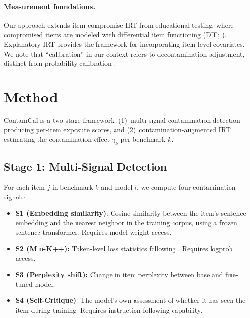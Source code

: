 \documentclass[11pt,a4paper]{article}
\newcommand{\gam}{\gamma}
\begin{document}
\paragraph{Measurement foundations.}
Our approach extends item compromise IRT \citep{eckerly2017detecting,sinharay2017assessment} from educational testing, where compromised items are modeled with differential item functioning (DIF; \citealp{holland1993differential,thissen1993detection,zumbo1999handbook}).
Explanatory IRT \citep{de2004explanatory} provides the framework for incorporating item-level covariates.
We note that ``calibration'' in our context refers to decontamination adjustment, distinct from probability calibration \citep{guo2017calibration,platt1999probabilistic}.

\section{Method}
\label{sec:method}

ContamCal is a two-stage framework: (1)~multi-signal contamination detection producing per-item exposure scores, and (2)~contamination-augmented IRT estimating the contamination effect $\gam_k$ per benchmark $k$.

\subsection{Stage 1: Multi-Signal Detection}
\label{sec:detection}

For each item $j$ in benchmark $k$ and model $i$, we compute four contamination signals:

\begin{itemize}
    \item \textbf{S1 (Embedding similarity)}: Cosine similarity between the item's sentence embedding and the nearest neighbor in the training corpus, using a frozen sentence-transformer. Requires model weight access.
    \item \textbf{S2 (Min-K++):} Token-level loss statistics following \citet{shi2024detecting}. Requires logprob access.
    \item \textbf{S3 (Perplexity shift):} Change in item perplexity between base and fine-tuned model.
    \item \textbf{S4 (Self-Critique):} The model's own assessment of whether it has seen the item during training. Requires instruction-following capability.
\end{itemize}
\end{document}
